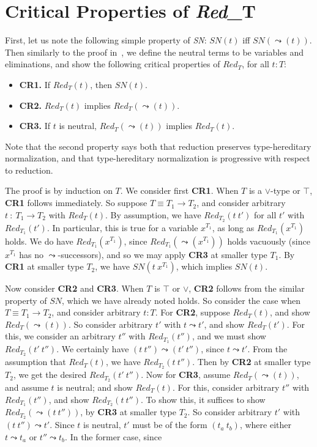 \documentclass{article}
\newcommand{\red}[0]{\textit{Red}}
\newcommand{\sn}[0]{\textit{SN}}
\begin{document}
\section{Critical Properties of \red_T}

First, let us note the following simple property of \sn: $\sn(t)$ iff
$\sn(\leadsto(t))$.  Then similarly to the proof in~\cite{1}, we
define the neutral terms to be variables and eliminations, and show
the following critical properties of $\red_T$, for all $t:T$:

\begin{itemize}
\item \textbf{CR1.} If $\red_T(t)$, then $\sn(t)$.
\item \textbf{CR2.} $\red_T(t)$ implies $\red_T(\leadsto(t))$.
\item \textbf{CR3.} If $t$ is neutral, $\red_T(\leadsto(t))$ implies
$\red_T(t)$.
\end{itemize}

\noindent Note that the second property says both that reduction
preserves type-hereditary normalization, and that type-hereditary
normalization is progressive with respect to reduction.

The proof is by induction on $T$.  We consider first \textbf{CR1}.
When $T$ is a $\vee$-type or $\top$, \textbf{CR1} follows immediately.
So suppose $T \equiv T_1\to T_2$, and consider arbitrary $t\ :\ T_1\to
T_2$ with $\red_{T}(t)$.  By assumption, we have $\red_{T_2}(t\ t')$
for all $t'$ with $\red_{T_1}(t')$.  In particular, this is true for a
variable $x^{T_1}$, as long as $\red_{T_1}(x^{T_1})$ holds.  We do
have $\red_{T_1}(x^{T_1})$, since $\red_{T_1}(\leadsto(x^{T_1}))$
holds vacuously (since $x^{T_1}$ has no $\leadsto$-successors), and so
we may apply \textbf{CR3} at smaller type $T_1$.  By \textbf{CR1} at
smaller type $T_2$, we have $\sn(t\ x^{T_1})$, which implies $\sn(t)$.

Now consider \textbf{CR2} and \textbf{CR3}.  When $T$ is $\top$ or
$\vee$, \textbf{CR2} follows from the similar property of $\sn$, which
we have already noted holds.  So consider the case when $T\equiv
T_1\to T_2$, and consider arbitrary $t:T$.  For \textbf{CR2}, suppose
$\red_{T}(t)$, and show $\red_T(\leadsto(t))$.  So consider arbitrary
$t'$ with $t\leadsto t'$, and show $\red_T(t')$.  For this, we
consider an arbitrary $t''$ with $\red_{T_1}(t'')$, and we must show
$\red_{T_2}(t'\ t'')$.  We certainly have $(t\ t'')\leadsto (t'\
t'')$, since $t\leadsto t'$.  From the assumption that $\red_{T}(t)$,
we have $\red_{T_2}(t\ t'')$.  Then by \textbf{CR2} at smaller type
$T_2$, we get the desired $\red_{T_2}(t'\ t'')$.  Now for
\textbf{CR3}, assume $\red_T(\leadsto(t))$, and assume $t$ is neutral;
and show $\red_T(t)$.  For this, consider arbitrary $t''$ with
$\red_{T_1}(t'')$, and show $\red_{T_2}(t\ t'')$.  To show this, it
suffices to show $\red_{T_2}(\leadsto(t\ t''))$, by \textbf{CR3} at
smaller type $T_2$.  So consider arbitrary $t'$ with $(t\ t'')\leadsto
t'$.  Since $t$ is neutral, $t'$ must be of the form $(t_a\ t_b)$, where
either $t \leadsto t_a$ or $t'' \leadsto t_b$.  In the former case,
since 






\end{document}
